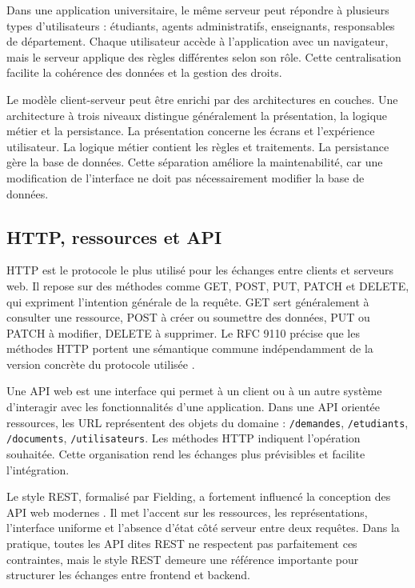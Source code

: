 Dans une application universitaire, le même serveur peut répondre à plusieurs types d'utilisateurs : étudiants, agents administratifs, enseignants, responsables de département. Chaque utilisateur accède à l'application avec un navigateur, mais le serveur applique des règles différentes selon son rôle. Cette centralisation facilite la cohérence des données et la gestion des droits.

Le modèle client-serveur peut être enrichi par des architectures en couches. Une architecture à trois niveaux distingue généralement la présentation, la logique métier et la persistance. La présentation concerne les écrans et l'expérience utilisateur. La logique métier contient les règles et traitements. La persistance gère la base de données. Cette séparation améliore la maintenabilité, car une modification de l'interface ne doit pas nécessairement modifier la base de données.

\subsection{HTTP, ressources et API}

HTTP est le protocole le plus utilisé pour les échanges entre clients et serveurs web. Il repose sur des méthodes comme GET, POST, PUT, PATCH et DELETE, qui expriment l'intention générale de la requête. GET sert généralement à consulter une ressource, POST à créer ou soumettre des données, PUT ou PATCH à modifier, DELETE à supprimer. Le RFC 9110 précise que les méthodes HTTP portent une sémantique commune indépendamment de la version concrète du protocole utilisée \cite{rfc9110}.

Une API web est une interface qui permet à un client ou à un autre système d'interagir avec les fonctionnalités d'une application. Dans une API orientée ressources, les URL représentent des objets du domaine : \texttt{/demandes}, \texttt{/etudiants}, \texttt{/documents}, \texttt{/utilisateurs}. Les méthodes HTTP indiquent l'opération souhaitée. Cette organisation rend les échanges plus prévisibles et facilite l'intégration.

Le style REST, formalisé par Fielding, a fortement influencé la conception des API web modernes \cite{fielding2000architectural}. Il met l'accent sur les ressources, les représentations, l'interface uniforme et l'absence d'état côté serveur entre deux requêtes. Dans la pratique, toutes les API dites REST ne respectent pas parfaitement ces contraintes, mais le style REST demeure une référence importante pour structurer les échanges entre frontend et backend.

